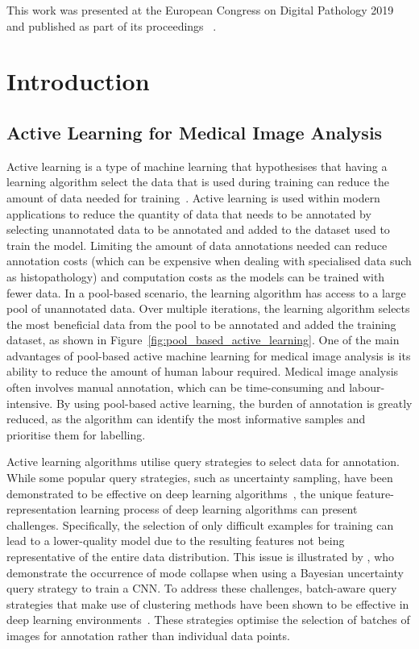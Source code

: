 This work was presented at the European Congress on Digital Pathology 2019 and published as part of its proceedings ~\citep{carse2019active}.



\section{Introduction}
\label{sec:active_introduction}
\subsection{Active Learning for Medical Image Analysis}
\label{subsec:active_for_medical_image_analysis}
Active learning is a type of machine learning that hypothesises that having a learning algorithm select the data that is used during training can reduce the amount of data needed for training~\citep{settles2009active}. Active learning is used within modern applications to reduce the quantity of data that needs to be annotated by selecting unannotated data to be annotated and added to the dataset used to train the model. Limiting the amount of data annotations needed can reduce annotation costs (which can be expensive when dealing with specialised data such as histopathology) and computation costs as the models can be trained with fewer data. In a pool-based scenario, the learning algorithm has access to a large pool of unannotated data. Over multiple iterations, the learning algorithm selects the most beneficial data from the pool to be annotated and added the training dataset, as shown in Figure~\ref{fig:pool_based_active_learning}. One of the main advantages of pool-based active machine learning for medical image analysis is its ability to reduce the amount of human labour required. Medical image analysis often involves manual annotation, which can be time-consuming and labour-intensive. By using pool-based active learning, the burden of annotation is greatly reduced, as the algorithm can identify the most informative samples and prioritise them for labelling.

Active learning algorithms utilise query strategies to select data for annotation. While some popular query strategies, such as uncertainty sampling, have been demonstrated to be effective on deep learning algorithms~\citep{gal2017deep}, the unique feature-representation learning process of deep learning algorithms can present challenges. Specifically, the selection of only difficult examples for training can lead to a lower-quality model due to the resulting features not being representative of the entire data distribution. This issue is illustrated by \cite{pop2018deep}, who demonstrate the occurrence of mode collapse when using a Bayesian uncertainty query strategy to train a CNN. To address these challenges, batch-aware query strategies that make use of clustering methods have been shown to be effective in deep learning environments~\citep{sener2017active, zhdanov2019diverse, kirsch2019batchbald}. These strategies optimise the selection of batches of images for annotation rather than individual data points.

